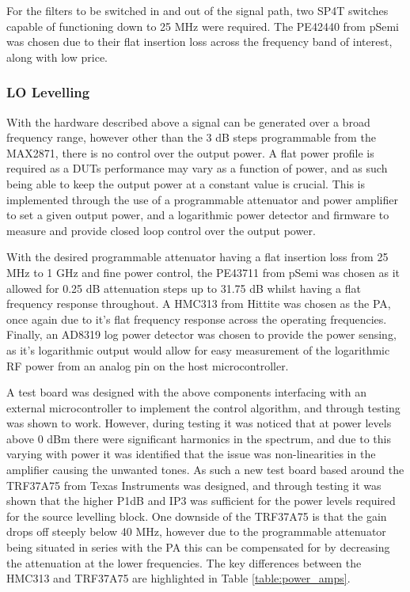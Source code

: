 For the filters to be switched in and out of the signal path, two SP4T switches capable of functioning down to 25 MHz were required. The PE42440 from pSemi was chosen due to their flat insertion loss across the frequency band of interest, along with low price. 

\subsubsection{LO Levelling}
With the hardware described above a signal can be generated over a broad frequency range, however other than the 3 dB steps programmable from the MAX2871, there is no control over the output power. A flat power profile is required as a DUTs performance may vary as a function of power, and as such being able to keep the output power at a constant value is crucial. This is implemented through the use of a programmable attenuator and power amplifier to set a given output power, and a logarithmic power detector and firmware to measure and provide closed loop control over the output power. 

With the desired programmable attenuator having a flat insertion loss from 25 MHz to 1 GHz and fine power control, the PE43711 from pSemi was chosen as it allowed for 0.25 dB attenuation steps up to 31.75 dB whilst having a flat frequency response throughout. A HMC313 from Hittite was chosen as the PA, once again due to it's flat frequency response across the operating frequencies. Finally, an AD8319 log power detector was chosen to provide the power sensing, as it's logarithmic output would allow for easy measurement of the logarithmic RF power from an analog pin on the host microcontroller. 

A test board was designed with the above components interfacing with an external microcontroller to implement the control algorithm, and through testing was shown to work. However, during testing it was noticed that at power levels above 0 dBm there were significant harmonics in the spectrum, and due to this varying with power it was identified that the issue was non-linearities in the amplifier causing the unwanted tones. As such a new test board based around the TRF37A75 from Texas Instruments was designed, and through testing it was shown that the higher P1dB and IP3 was sufficient for the power levels required for the source levelling block. One downside of the TRF37A75 is that the gain drops off steeply below 40 MHz, however due to the programmable attenuator being situated in series with the PA this can be compensated for by decreasing the attenuation at the lower frequencies. The key differences between the HMC313 and TRF37A75 are highlighted in Table \ref{table:power_amps}.

